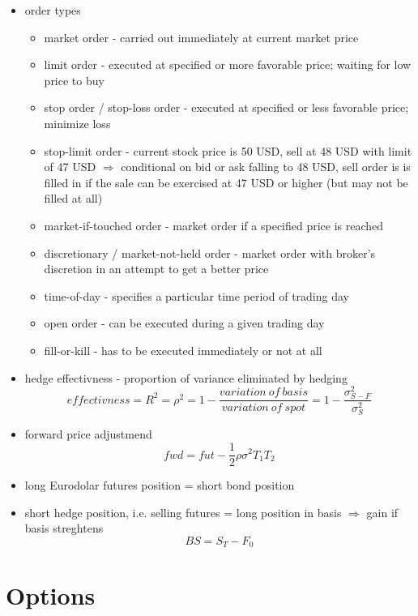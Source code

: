 \begin{itemize}
\item order types
\begin{itemize}
\item market order - carried out immediately at current market price
\item limit order - executed at specified or more favorable price; waiting for low price to buy
\item stop order / stop-loss order - executed at specified or less favorable price; minimize loss
\item stop-limit order - current stock price is 50 USD, sell at 48 USD with limit of 47 USD $\Rightarrow$ conditional on bid or ask falling to 48 USD, sell order is is filled in if the sale can be exercised at 47 USD or higher (but may not be filled at all)
\item market-if-touched order - market order if a specified price is reached
\item discretionary / market-not-held order - market order with broker's discretion in an attempt to get a better price
\item time-of-day - specifies a particular time period of trading day
\item open order - can be executed during a given trading day
\item fill-or-kill - has to be executed immediately or not at all
\end{itemize}
\item hedge effectivness - proportion of variance eliminated by hedging
\begin{equation*}
effectivness = R^2 = \rho^2 = 1 - \frac{variation~of~basis}{variation~of~spot} = 1 - \frac{\sigma^2_{S - F}}{\sigma^2_S}
\end{equation*}
\item forward price adjustmend
\begin{equation*}
fwd = fut - \frac{1}{2}\rho \sigma^2 T_1 T_2
\end{equation*}
\item long Eurodolar futures position = short bond position
\item short hedge position, i.e. selling futures = long position in basis $\Rightarrow$ gain if basis streghtens
\begin{equation*}
BS = S_T - F_0
\end{equation*}
\end{itemize}

\section{Options}

